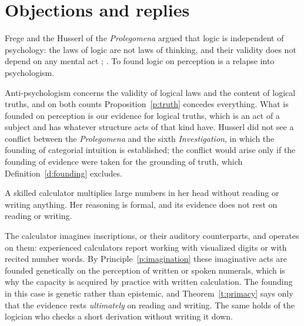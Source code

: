 \documentclass{situationist-preprint}
\begin{document}
\section{Objections and replies}

\begin{objection}
Frege and the Husserl of the \emph{Prolegomena} argued that logic is independent of psychology: the laws of logic are not laws of thinking, and their validity does not depend on any mental act \citep{Frege1884}; \citep[Prolegomena]{Husserl1900}. To found logic on perception is a relapse into psychologism.
\end{objection}

\begin{reply}
Anti-psychologism concerns the validity of logical laws and the content of logical truths, and on both counts Proposition~\ref{p:truth} concedes everything. What is founded on perception is our evidence for logical truths, which is an act of a subject and has whatever structure acts of that kind have. Husserl did not see a conflict between the \emph{Prolegomena} and the sixth \emph{Investigation}, in which the founding of categorial intuition is established; the conflict would arise only if the founding of evidence were taken for the grounding of truth, which Definition~\ref{d:founding} excludes.
\end{reply}

\begin{objection}
A skilled calculator multiplies large numbers in her head without reading or writing anything. Her reasoning is formal, and its evidence does not rest on reading or writing.
\end{objection}

\begin{reply}
The calculator imagines inscriptions, or their auditory counterparts, and operates on them: experienced calculators report working with visualized digits or with recited number words. By Principle~\ref{p:imagination} these imaginative acts are founded genetically on the perception of written or spoken numerals, which is why the capacity is acquired by practice with written calculation. The founding in this case is genetic rather than epistemic, and Theorem~\ref{t:primacy} says only that the evidence rests \emph{ultimately} on reading and writing. The same holds of the logician who checks a short derivation without writing it down.
\end{reply}
\end{document}

